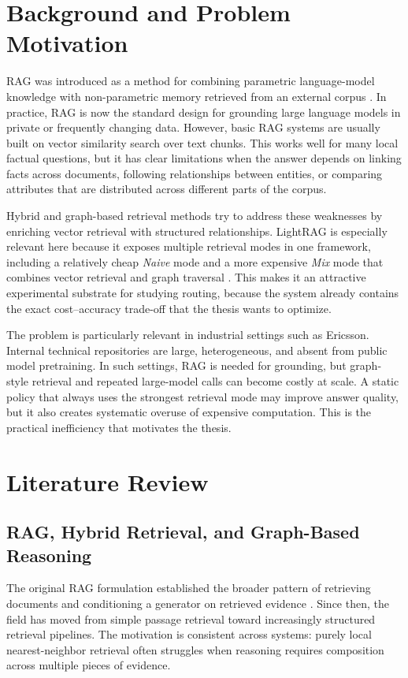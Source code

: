\documentclass[11pt, a4paper]{article}
\begin{document}
\section{Background and Problem Motivation}

RAG was introduced as a method for combining parametric language-model knowledge with non-parametric memory retrieved from an external corpus \cite{lewis2020rag}. In practice, RAG is now the standard design for grounding large language models in private or frequently changing data. However, basic RAG systems are usually built on vector similarity search over text chunks. This works well for many local factual questions, but it has clear limitations when the answer depends on linking facts across documents, following relationships between entities, or comparing attributes that are distributed across different parts of the corpus.

Hybrid and graph-based retrieval methods try to address these weaknesses by enriching vector retrieval with structured relationships. LightRAG is especially relevant here because it exposes multiple retrieval modes in one framework, including a relatively cheap \emph{Naive} mode and a more expensive \emph{Mix} mode that combines vector retrieval and graph traversal \cite{lightrag2024}. This makes it an attractive experimental substrate for studying routing, because the system already contains the exact cost--accuracy trade-off that the thesis wants to optimize.

The problem is particularly relevant in industrial settings such as Ericsson. Internal technical repositories are large, heterogeneous, and absent from public model pretraining. In such settings, RAG is needed for grounding, but graph-style retrieval and repeated large-model calls can become costly at scale. A static policy that always uses the strongest retrieval mode may improve answer quality, but it also creates systematic overuse of expensive computation. This is the practical inefficiency that motivates the thesis.

\section{Literature Review}

\subsection{RAG, Hybrid Retrieval, and Graph-Based Reasoning}

The original RAG formulation established the broader pattern of retrieving documents and conditioning a generator on retrieved evidence \cite{lewis2020rag}. Since then, the field has moved from simple passage retrieval toward increasingly structured retrieval pipelines. The motivation is consistent across systems: purely local nearest-neighbor retrieval often struggles when reasoning requires composition across multiple pieces of evidence.
\end{document}
